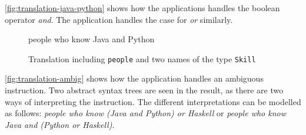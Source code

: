 \autoref{fig:translation-java-python} shows how the applications handles the boolean operator \emph{and}. The application handles the case for \emph{or} similarly.

\begin{figure}[H]
\begin{terminal}
people who know Java and Python
\end{terminal}
\begin{json-small}
\end{json-small}
\caption{Translation including \texttt{people} and two names of the type \texttt{Skill}\label{fig:translation-java-python}}
\end{figure}

\newpage

\autoref{fig:translation-ambig} shows how the application handles an ambiguous instruction. Two abstract syntax trees are seen in the result, as there are two ways of interpreting the instruction. The different interpretations can be modelled as follows: \emph{people who know (Java and Python) or Haskell} or \emph{people who know Java and (Python or Haskell)}.

